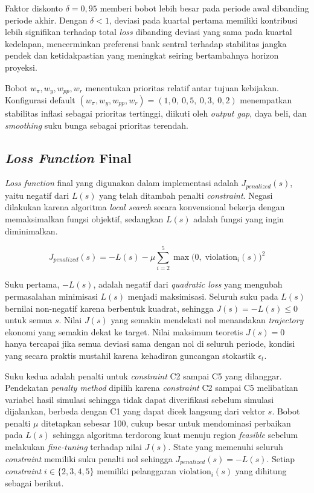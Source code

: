 Faktor diskonto $\delta = 0{,}95$ memberi bobot lebih besar pada periode awal dibanding periode akhir. Dengan $\delta < 1$, deviasi pada kuartal pertama memiliki kontribusi lebih signifikan terhadap total \textit{loss} dibanding deviasi yang sama pada kuartal kedelapan, mencerminkan preferensi bank sentral terhadap stabilitas jangka pendek dan ketidakpastian yang meningkat seiring bertambahnya horizon proyeksi.

Bobot $w_\pi, w_y, w_{pp}, w_r$ menentukan prioritas relatif antar tujuan kebijakan. Konfigurasi default $(w_\pi, w_y, w_{pp}, w_r) = (1{,}0,\ 0{,}5,\ 0{,}3,\ 0{,}2)$ menempatkan stabilitas inflasi sebagai prioritas tertinggi, diikuti oleh \textit{output gap}, daya beli, dan \textit{smoothing} suku bunga sebagai prioritas terendah.

\subsection{\textit{Loss Function} Final}

\textit{Loss function} final yang digunakan dalam implementasi adalah $J_{penalized}(s)$, yaitu negatif dari $L(s)$ yang telah ditambah penalti \textit{constraint}. Negasi dilakukan karena algoritma \textit{local search} secara konvensional bekerja dengan memaksimalkan fungsi objektif, sedangkan $L(s)$ adalah fungsi yang ingin diminimalkan.

\[
    J_{penalized}(s) = -L(s) - \mu \sum_{i=2}^{5} \max\!\big(0,\; \text{violation}_i(s)\big)^2
\]

Suku pertama, $-L(s)$, adalah negatif dari \textit{quadratic loss} yang mengubah permasalahan minimisasi $L(s)$ menjadi maksimisasi. Seluruh suku pada $L(s)$ bernilai non-negatif karena berbentuk kuadrat, sehingga $J(s) = -L(s) \leq 0$ untuk semua $s$. Nilai $J(s)$ yang semakin mendekati nol menandakan \textit{trajectory} ekonomi yang semakin dekat ke target. Nilai maksimum teoretis $J(s) = 0$ hanya tercapai jika semua deviasi sama dengan nol di seluruh periode, kondisi yang secara praktis mustahil karena kehadiran guncangan stokastik $\epsilon_t$.

Suku kedua adalah penalti untuk \textit{constraint} C2 sampai C5 yang dilanggar. Pendekatan \textit{penalty method} dipilih karena \textit{constraint} C2 sampai C5 melibatkan variabel hasil simulasi sehingga tidak dapat diverifikasi sebelum simulasi dijalankan, berbeda dengan C1 yang dapat dicek langsung dari vektor $s$. Bobot penalti $\mu$ ditetapkan sebesar 100, cukup besar untuk mendominasi perbaikan pada $L(s)$ sehingga algoritma terdorong kuat menuju region \textit{feasible} sebelum melakukan \textit{fine-tuning} terhadap nilai $J(s)$. State yang memenuhi seluruh \textit{constraint} memiliki suku penalti nol sehingga $J_{penalized}(s) = -L(s)$. Setiap \textit{constraint} $i \in \{2, 3, 4, 5\}$ memiliki pelanggaran $\text{violation}_i(s)$ yang dihitung sebagai berikut.

